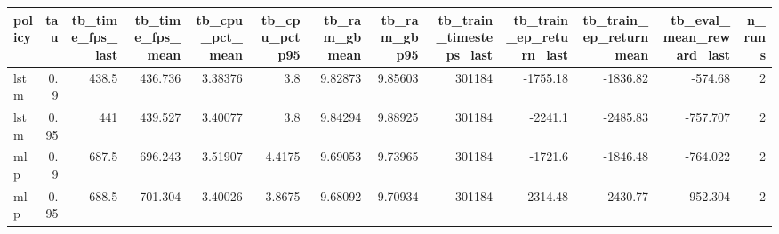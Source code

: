 \begin{tabular}{lrrrrrrrrrrrr}
\toprule
policy & tau & tb_time_fps_last & tb_time_fps_mean & tb_cpu_pct_mean & tb_cpu_pct_p95 & tb_ram_gb_mean & tb_ram_gb_p95 & tb_train_timesteps_last & tb_train_ep_return_last & tb_train_ep_return_mean & tb_eval_mean_reward_last & n_runs \\
\midrule
lstm & 0.9 & 438.5 & 436.736 & 3.38376 & 3.8 & 9.82873 & 9.85603 & 301184 & -1755.18 & -1836.82 & -574.68 & 2 \\
lstm & 0.95 & 441 & 439.527 & 3.40077 & 3.8 & 9.84294 & 9.88925 & 301184 & -2241.1 & -2485.83 & -757.707 & 2 \\
mlp & 0.9 & 687.5 & 696.243 & 3.51907 & 4.4175 & 9.69053 & 9.73965 & 301184 & -1721.6 & -1846.48 & -764.022 & 2 \\
mlp & 0.95 & 688.5 & 701.304 & 3.40026 & 3.8675 & 9.68092 & 9.70934 & 301184 & -2314.48 & -2430.77 & -952.304 & 2 \\
\bottomrule
\end{tabular}
